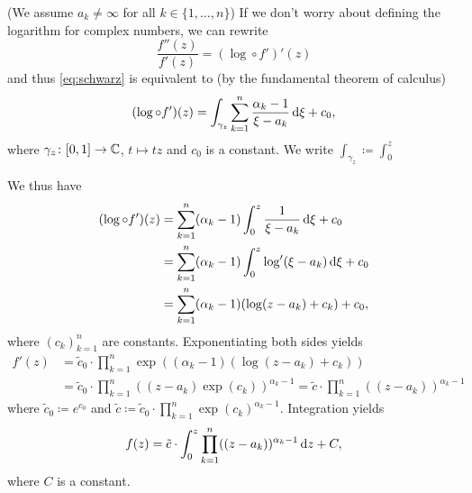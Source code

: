 \documentclass[a4paper,english]{article}
\begin{document}
\begin{pr}
    (We assume $a_k \ne \infty$ for all $k \in \{1, \ldots, n \}$)
    If we don't worry about defining the logarithm for complex numbers, we can rewrite
    \begin{equation*}
        \frac{f''(z)}{f'(z)}
        = ( \log \circ f')'(z)
    \end{equation*}
    and thus \eqref{eq:schwarz} is equivalent to (by the fundamental theorem of calculus)
    \begin{equation*}
        (\log \circ f')(z)
        = \int_{\gamma_z} \sum_{k = 1}^{n} \frac{\alpha_k - 1}{\xi - a_k} \mathop{}\!\mathrm{d}{\xi} + c_0,
    \end{equation*}
    where $\gamma_z \colon [0, 1] \to \operatorname{\mathbb{C}}$, $t \mapsto t z$ and $c_0$ is a constant. We write $\int_{\gamma_z} \coloneqq \int_0^{z}$
    
    We thus have
    \begin{align*}
        (\log \circ f')(z)
        & = \sum_{k = 1}^{n} (\alpha_k - 1) \int_{0}^{z} \frac{1}{\xi - a_k} \mathop{}\!\mathrm{d}{\xi} + c_0 \\
        & = \sum_{k = 1}^{n} (\alpha_k - 1) \int_{0}^{z} \log'(\xi - a_k) \mathop{}\!\mathrm{d}{\xi} + c_0 \\
        & = \sum_{k = 1}^{n} (\alpha_k - 1)(\log(z - a_k) + c_k) + c_0,
    \end{align*}
    where $(c_k)_{k = 1}^{n}$ are constants.
    Exponentiating both sides yields 
    \begin{align*}
        f'(z)
        & = \tilde{c}_0 \cdot \prod_{k = 1}^{n} \exp\left((\alpha_k - 1)(\log(z - a_k) + c_k)\right) \\
        & = \tilde{c}_0 \cdot \prod_{k = 1}^{n} ((z - a_k)\exp(c_k))^{\alpha_k - 1}
        = \tilde{c} \cdot \prod_{k = 1}^{n} ((z - a_k))^{\alpha_k - 1}
    \end{align*}
    where $\tilde{c}_0 \coloneqq e^{c_0}$ and $\tilde{c} \coloneqq \tilde{c}_0 \cdot \prod_{k = 1}^{n} \exp(c_k)^{\alpha_k - 1}$.
    Integration yields
    \begin{equation*}
        f(z)
        = \tilde{c} \cdot \int_{0}^{z} \prod_{k = 1}^{n}  ((z - a_k))^{\alpha_k - 1} \mathop{}\!\mathrm{d}{z} + C,
    \end{equation*}
    where $C$ is a constant.
\end{pr}
\end{document}
